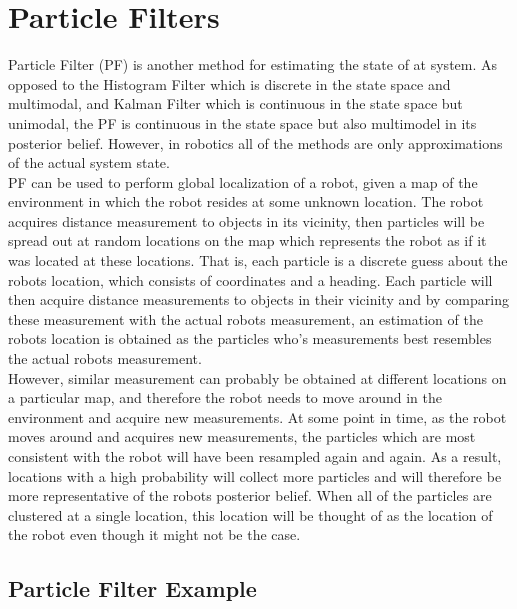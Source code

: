 
\section{Particle Filters}

Particle Filter (PF) is another method for estimating the state of at system. As opposed to the Histogram Filter which is discrete in the state space and multimodal, and Kalman Filter which is continuous in the state space but unimodal, the PF is continuous in the state space but also multimodel in its posterior belief. However, in robotics all of the methods are only approximations of the actual system state.\\

PF can be used to perform global localization of a robot, given a map of the environment in which the robot resides at some unknown location. The robot acquires distance measurement to objects in its vicinity, then particles will be spread out at random locations on the map which represents the robot as if it was located at these locations. That is, each particle is a discrete guess about the robots location, which consists of coordinates and a heading. Each particle will then acquire distance measurements to objects in their vicinity and by comparing these measurement with the actual robots measurement, an estimation of the robots location is obtained as the particles who's measurements best resembles the actual robots measurement.\\

However, similar measurement can probably be obtained at different locations on a particular map, and therefore the robot needs to move around in the environment and acquire new measurements. At some point in time, as the robot moves around and acquires new measurements, the particles which are most consistent with the robot will have been resampled again and again. As a result, locations with a high probability will collect more particles and will therefore be more representative of the robots posterior belief. When all of the particles are clustered at a single location, this location will be thought of as the location of the robot even though it might not be the case.\\

\subsection{Particle Filter Example}

